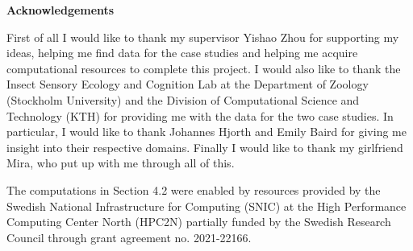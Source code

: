 \newenvironment{acknowledgements}%
    {\cleardoublepage\thispagestyle{empty}\null\vfill\begin{center}%
    \bfseries Acknowledgements\end{center}}%
    {\vfill\null}
        \begin{acknowledgements}
          First of all I would like to thank my supervisor Yishao Zhou for supporting my ideas, helping me find data for the case studies and helping me acquire computational resources to complete this project. I would also  like to thank the Insect Sensory Ecology and Cognition Lab at the Department of Zoology (Stockholm University) and the Division of Computational Science and Technology (KTH) for providing me with the data for the two case studies. In particular, I would like to thank Johannes Hjorth and Emily Baird for giving me insight into their respective domains. Finally I would like to thank my girlfriend Mira, who put up with me through all of this.

          The computations in Section 4.2 were enabled by resources provided by the Swedish National Infrastructure for Computing (SNIC) at the High Performance Computing Center North (HPC2N) partially funded by the Swedish Research Council through grant agreement no. 2021-22166.
        \end{acknowledgements}
